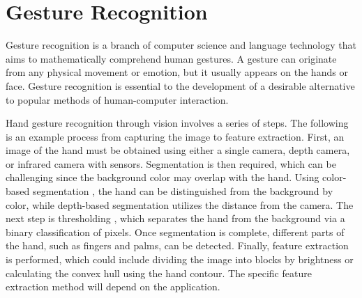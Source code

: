 \section{Gesture Recognition}
Gesture recognition is a branch of computer science and language technology that aims to mathematically comprehend human gestures. A gesture can originate from any physical movement or emotion, but it usually appears on the hands or face. \cite{smith2022hand} Gesture recognition is essential to the development of a desirable alternative to popular methods of human-computer interaction.

Hand gesture recognition through vision involves a series of steps. The following is an example process from capturing the image to feature extraction. First, an image of the hand must be obtained using either a single camera, depth camera, or infrared camera with sensors. Segmentation is then required, which can be challenging since the background color may overlap with the hand. Using color-based segmentation \cite{dwina2018skin}, the hand can be distinguished from the background by color, while depth-based segmentation utilizes the distance from the camera. The next step is thresholding \cite{Mod_Maasum_2015}, which separates the hand from the background via a binary classification of pixels. Once segmentation is complete, different parts of the hand, such as fingers and palms, can be detected. Finally, feature extraction is performed, which could include dividing the image into blocks by brightness or calculating the convex hull using the hand contour. The specific feature extraction method will depend on the application. 

